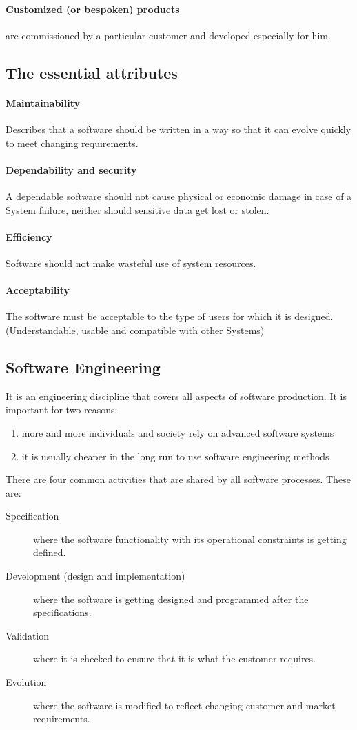 \documentclass[a4paper,11pt,twocolumn]{report}
\begin{document}
    \paragraph{Customized (or bespoken) products}
    are commissioned by a particular customer and developed especially for him.
    \subsection{The essential attributes}
    \paragraph{Maintainability}
    Describes that a software should be written in a way so that it can evolve
    quickly to meet changing requirements.
    \paragraph{Dependability and security}
    A dependable software should not cause physical or economic damage in case
    of a System failure, neither should sensitive data get lost or stolen.
    \paragraph{Efficiency}
    Software should not make wasteful use of system resources.
    \paragraph{Acceptability}
    The software must be acceptable to the type of users for which it is
    designed. (Understandable, usable and compatible with other Systems)
    \subsection{Software Engineering}
    It is an engineering discipline that covers all aspects of software
    production.
    It is important for two reasons:
    \begin{enumerate}
        \item more and more individuals and society rely on advanced software
            systems
        \item it is usually cheaper in the long run to use software engineering
            methods
    \end{enumerate}
    There are four common activities that are shared by all software processes.
    These are:
    \begin{description}
        \item[Specification] where the software functionality with its 
            operational constraints is getting defined.
        \item[Development (design and implementation)] where the software is 
            getting designed and programmed after the specifications.
        \item[Validation] where it is checked to ensure that it is what the
            customer requires.
        \item[Evolution] where the software is modified to reflect changing
            customer and market requirements.
    \end{description}
\end{document}
